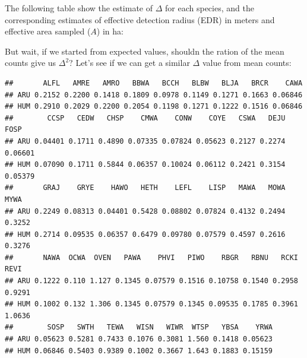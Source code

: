 \documentclass[12pt,]{book}
\newenvironment{Shaded}{\begin{snugshade}}{\end{snugshade}}
\newcommand{\DataTypeTok}[1]{\textcolor[rgb]{0.13,0.29,0.53}{#1}}
\newcommand{\DecValTok}[1]{\textcolor[rgb]{0.00,0.00,0.81}{#1}}
\newcommand{\KeywordTok}[1]{\textcolor[rgb]{0.13,0.29,0.53}{\textbf{#1}}}
\newcommand{\NormalTok}[1]{#1}
\newcommand{\OperatorTok}[1]{\textcolor[rgb]{0.81,0.36,0.00}{\textbf{#1}}}
\newcommand{\StringTok}[1]{\textcolor[rgb]{0.31,0.60,0.02}{#1}}
\begin{document}
The following table show the estimate of \(\Delta\) for each species,
and the corresponding estimates of effective detection radius (EDR) in meters
and effective area sampled (\(A\)) in ha:

But wait, if we started from expected values, shouldn the ration of
the mean counts give us \(\Delta^2\)?
Let's see if we can get a similar \(\Delta\) value from mean counts:

\begin{Shaded}
\end{Shaded}

\begin{verbatim}
##       ALFL   AMRE   AMRO   BBWA   BCCH   BLBW   BLJA   BRCR    CAWA
## ARU 0.2152 0.2200 0.1418 0.1809 0.0978 0.1149 0.1271 0.1663 0.06846
## HUM 0.2910 0.2029 0.2200 0.2054 0.1198 0.1271 0.1222 0.1516 0.06846
##        CCSP   CEDW   CHSP    CMWA    CONW    COYE   CSWA   DEJU    FOSP
## ARU 0.04401 0.1711 0.4890 0.07335 0.07824 0.05623 0.2127 0.2274 0.06601
## HUM 0.07090 0.1711 0.5844 0.06357 0.10024 0.06112 0.2421 0.3154 0.05379
##       GRAJ    GRYE    HAWO   HETH    LEFL    LISP   MAWA   MOWA   MYWA
## ARU 0.2249 0.08313 0.04401 0.5428 0.08802 0.07824 0.4132 0.2494 0.3252
## HUM 0.2714 0.09535 0.06357 0.6479 0.09780 0.07579 0.4597 0.2616 0.3276
##       NAWA  OCWA  OVEN   PAWA    PHVI   PIWO    RBGR   RBNU   RCKI   REVI
## ARU 0.1222 0.110 1.127 0.1345 0.07579 0.1516 0.10758 0.1540 0.2958 0.9291
## HUM 0.1002 0.132 1.306 0.1345 0.07579 0.1345 0.09535 0.1785 0.3961 1.0636
##        SOSP   SWTH   TEWA   WISN   WIWR  WTSP   YBSA    YRWA
## ARU 0.05623 0.5281 0.7433 0.1076 0.3081 1.560 0.1418 0.05623
## HUM 0.06846 0.5403 0.9389 0.1002 0.3667 1.643 0.1883 0.15159
\end{verbatim}

\begin{Shaded}
\end{Shaded}
\end{document}
